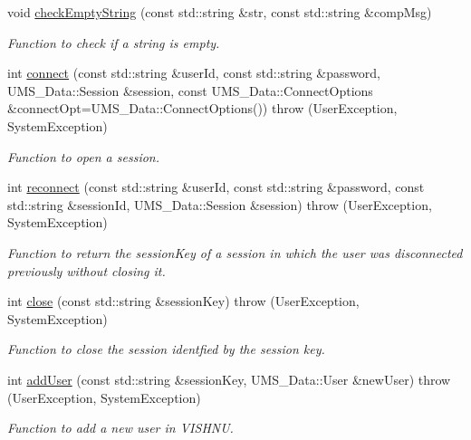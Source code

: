 \begin{DoxyCompactItemize}
void \hyperlink{namespacevishnu_a1c6d3d877a77eb1a3eb8f33496bb6bf7}{checkEmptyString} (const std::string \&str, const std::string \&compMsg)
\begin{DoxyCompactList}\small\item\em Function to check if a string is empty. \item\end{DoxyCompactList}\item 
int \hyperlink{namespacevishnu_ac58b058a6a467a21f7eb21192617c90f}{connect} (const std::string \&userId, const std::string \&password, UMS\_\-Data::Session \&session, const UMS\_\-Data::ConnectOptions \&connectOpt=UMS\_\-Data::ConnectOptions())  throw (UserException, SystemException)
\begin{DoxyCompactList}\small\item\em Function to open a session. \item\end{DoxyCompactList}\item 
int \hyperlink{namespacevishnu_ae120231ba899d68724dc972374206745}{reconnect} (const std::string \&userId, const std::string \&password, const std::string \&sessionId, UMS\_\-Data::Session \&session)  throw (UserException, SystemException)
\begin{DoxyCompactList}\small\item\em Function to return the sessionKey of a session in which the user was disconnected previously without closing it. \item\end{DoxyCompactList}\item 
int \hyperlink{namespacevishnu_a925f5cdd60d012ebd98cd328ed60d398}{close} (const std::string \&sessionKey)  throw (UserException, SystemException)
\begin{DoxyCompactList}\small\item\em Function to close the session identfied by the session key. \item\end{DoxyCompactList}\item 
int \hyperlink{namespacevishnu_ac7cd83030f8f6e990001b238a9f50640}{addUser} (const std::string \&sessionKey, UMS\_\-Data::User \&newUser)  throw (UserException, SystemException)
\begin{DoxyCompactList}\small\item\em Function to add a new user in VISHNU. \item\end{DoxyCompactList}\item 

\end{DoxyCompactItemize}
